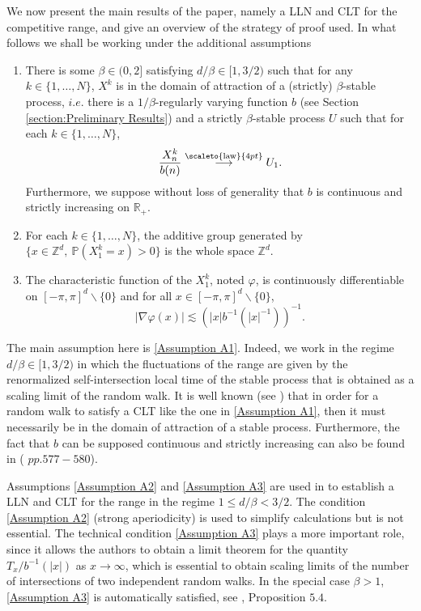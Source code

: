 \documentclass[12pt]{article}
\newcommand{\RR}{\mathbb R}
\newcommand{\PP}{\mathbb P}
\newcommand{\1}{\mathds{1}}
\newcommand{\ZZ}{\mathbb Z}
\newcommand{\distribution}{\stackrel{\scaleto{\mathrm{law}}{4pt}}{\longrightarrow}}
\numberwithin{equation}{section}
\begin{document}
We now present the main results of the paper, namely a LLN and CLT for the competitive range, and give an overview of the strategy of proof used. In what follows we shall be working under the additional assumptions
\begin{enumerate}[label=(A\arabic*)]
    \item
    \label{Assumption A1}
    There is some $\beta\in(0,2]$ satisfying $d/\beta\in[1,3/2)$ such that   for any $k\in\{1,\dots,N\}$, $X^k$ is in the domain of attraction of a (strictly) $\beta$-stable process, $i.e.$ there is a $1/\beta$-regularly varying function $b$ (see Section \ref{section:Preliminary Results}) and a strictly $\beta$-stable process $U$ such that for each $k\in\{1,\dots,N\}$,
    \begin{equation*}
        \frac{X_n^k}{b(n)}\distribution U_1.
    \end{equation*}
    Furthermore, we suppose without loss of generality that $b$ is continuous and strictly increasing on $\RR_+$. 
    \item
    \label{Assumption A2}
    For each $k\in\{1,\dots,N\}$, the additive group generated by $\{x\in\ZZ^d,\ \PP\left(X_1^k=x\right)>0\}$ is the whole space $\ZZ^d$.
    \item
    \label{Assumption A3}
    The characteristic function of the $X_1^k$, noted $\varphi$, is continuously differentiable on $[-\pi,\pi]^d\backslash\{0\}$ and for all $x\in[-\pi,\pi]^d\backslash\{0\}$,
    \begin{equation*}
        |\nabla\varphi(x)|\lesssim\left(|x| b^{-1}(|x|^{-1})\right)^{-1}.
    \end{equation*}
\end{enumerate}

The main assumption here is \ref{Assumption A1}. Indeed, we work in the regime $d/\beta\in[1,3/2)$ in which the fluctuations of the range are given by the renormalized self-intersection local time of the stable process that is obtained as a scaling limit of the random walk. It is well known (see \cite{feller1991introduction}) that in order for a random walk to satisfy a CLT like the one in \ref{Assumption A1}, then it must necessarily be in the domain of attraction of a stable process. Furthermore, the fact that $b$ can be supposed continuous and strictly increasing can also be found in (\cite{feller1991introduction} $pp. 577-580$).

Assumptions \ref{Assumption A2} and \ref{Assumption A3} are used in \cite{LeGallRosenRangeOfStableRandomWalks1991} to establish a LLN and CLT for the range in the regime $1\le d/\beta<3/2$. The condition \ref{Assumption A2} (strong aperiodicity) is used to simplify calculations but is not essential. The technical condition \ref{Assumption A3} plays a more important role, since it allows the authors to obtain a limit theorem for the quantity $T_x/b^{-1}(|x|)$ as $x\rightarrow\infty$, which is essential to obtain scaling limits of the number of intersections of two independent random walks. In the special case $\beta>1$, \ref{Assumption A3} is automatically satisfied, see \cite{LeGallRosenRangeOfStableRandomWalks1991}, Proposition $5.4$.
\end{document}
